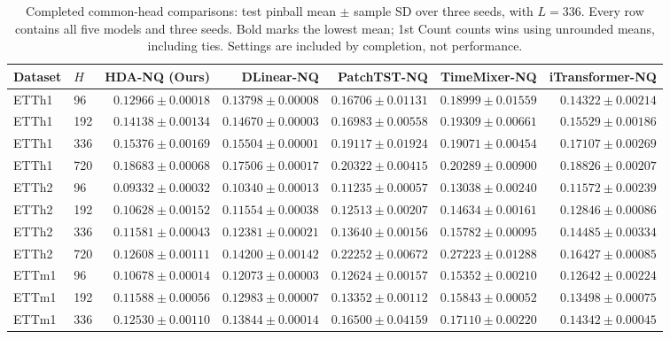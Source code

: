 \begin{table}[t]
\centering\small
\caption{Completed common-head comparisons: test pinball mean $\pm$ sample SD over three seeds, with $L=336$. Every row contains all five models and three seeds. Bold marks the lowest mean; 1st Count counts wins using unrounded means, including ties. Settings are included by completion, not performance.}
\label{tab:external}
\begin{tabular*}{\textwidth}{@{\extracolsep{\fill}}llrrrrr@{}}
\toprule
Dataset & $H$ & HDA-NQ (Ours) & DLinear-NQ & PatchTST-NQ & TimeMixer-NQ & iTransformer-NQ \\
\midrule
ETTh1 & 96 & $\boldsymbol{0.12966\pm0.00018}$ & $0.13798\pm0.00008$ & $0.16706\pm0.01131$ & $0.18999\pm0.01559$ & $0.14322\pm0.00214$ \\
ETTh1 & 192 & $\boldsymbol{0.14138\pm0.00134}$ & $0.14670\pm0.00003$ & $0.16983\pm0.00558$ & $0.19309\pm0.00661$ & $0.15529\pm0.00186$ \\
ETTh1 & 336 & $\boldsymbol{0.15376\pm0.00169}$ & $0.15504\pm0.00001$ & $0.19117\pm0.01924$ & $0.19071\pm0.00454$ & $0.17107\pm0.00269$ \\
ETTh1 & 720 & $0.18683\pm0.00068$ & $\boldsymbol{0.17506\pm0.00017}$ & $0.20322\pm0.00415$ & $0.20289\pm0.00900$ & $0.18826\pm0.00207$ \\
ETTh2 & 96 & $\boldsymbol{0.09332\pm0.00032}$ & $0.10340\pm0.00013$ & $0.11235\pm0.00057$ & $0.13038\pm0.00240$ & $0.11572\pm0.00239$ \\
ETTh2 & 192 & $\boldsymbol{0.10628\pm0.00152}$ & $0.11554\pm0.00038$ & $0.12513\pm0.00207$ & $0.14634\pm0.00161$ & $0.12846\pm0.00086$ \\
ETTh2 & 336 & $\boldsymbol{0.11581\pm0.00043}$ & $0.12381\pm0.00021$ & $0.13640\pm0.00156$ & $0.15782\pm0.00095$ & $0.14485\pm0.00334$ \\
ETTh2 & 720 & $\boldsymbol{0.12608\pm0.00111}$ & $0.14200\pm0.00142$ & $0.22252\pm0.00672$ & $0.27223\pm0.01288$ & $0.16427\pm0.00085$ \\
ETTm1 & 96 & $\boldsymbol{0.10678\pm0.00014}$ & $0.12073\pm0.00003$ & $0.12624\pm0.00157$ & $0.15352\pm0.00210$ & $0.12642\pm0.00224$ \\
ETTm1 & 192 & $\boldsymbol{0.11588\pm0.00056}$ & $0.12983\pm0.00007$ & $0.13352\pm0.00112$ & $0.15843\pm0.00052$ & $0.13498\pm0.00075$ \\
ETTm1 & 336 & $\boldsymbol{0.12530\pm0.00110}$ & $0.13844\pm0.00014$ & $0.16500\pm0.04159$ & $0.17110\pm0.00220$ & $0.14342\pm0.00045$ \\

\end{tabular*}
\end{table}
